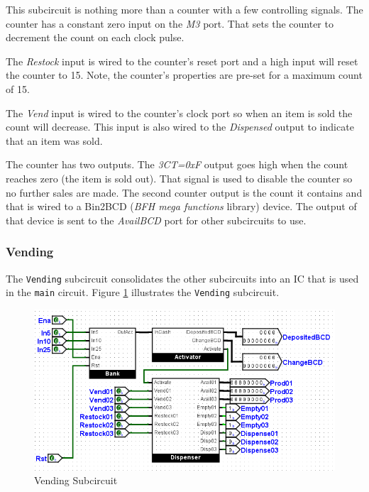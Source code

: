 This subcircuit is nothing more than a counter with a few controlling signals. The counter has a constant zero input on the \textit{M3} port. That sets the counter to decrement the count on each clock pulse.

The \textit{Restock} input is wired to the counter's reset port and a high input will reset the counter to 15. Note, the counter's properties are pre-set for a maximum count of 15.

The \textit{Vend} input is wired to the counter's clock port so when an item is sold the count will decrease. This input is also wired to the \textit{Dispensed} output to indicate that an item was sold.

The counter has two outputs. The \textit{3CT=0xF} output goes high when the count reaches zero (the item is sold out). That signal is used to disable the counter so no further sales are made. The second counter output is the count it contains and that is wired to a Bin2BCD (\textit{BFH mega functions} library) device. The output of that device is sent to the \textit{AvailBCD} port for other subcircuits to use.

\subsubsection{Vending}

The \lstinline[columns=fixed]|Vending| subcircuit consolidates the other subcircuits into an \ac{IC} that is used in the \lstinline[columns=fixed]|main| circuit. Figure \ref{fig:05-06} illustrates the \lstinline[columns=fixed]|Vending| subcircuit.

\begin{figure}[H]
	\centering
	\includegraphics[width=\maxwidth{.95\linewidth}]{gfx/05-06}
	\caption{Vending Subcircuit}
	\label{fig:05-06}
\end{figure}

